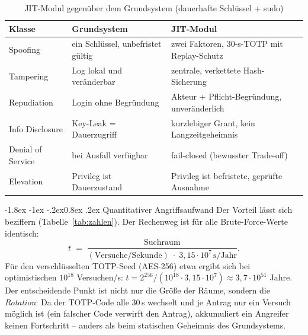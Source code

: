 \documentclass[11pt,a4paper]{article}
\makeatletter
\renewcommand\subsection{\@startsection{subsection}{2}{\z@}%
  {-1.8ex \@plus -1ex \@minus -.2ex}{0.8ex \@plus .2ex}%
  {\normalfont\large\bfseries}}
\makeatother
\begin{document}
\begin{table}[htbp]
  \centering
  \caption{JIT-Modul gegenüber dem Grundsystem (dauerhafte Schlüssel + sudo)}
  \label{tab:vergleich}
  \small
  \renewcommand{\arraystretch}{1.25}
  \begin{tabular}{@{}p{3.3cm}p{5.0cm}p{4.9cm}@{}}
    \toprule
    \textbf{Klasse} & \textbf{Grundsystem} & \textbf{JIT-Modul} \\
    \midrule
    Spoofing          & ein Schlüssel, unbefristet gültig    & zwei Faktoren, 30-s-TOTP mit Replay-Schutz \\
    \addlinespace[4pt]
    Tampering         & Log lokal und veränderbar            & zentrale, verkettete Hash-Sicherung \\
    \addlinespace[4pt]
    Repudiation       & Login ohne Begründung                & Akteur + Pflicht-Begründung, unveränderlich \\
    \addlinespace[4pt]
    Info Disclosure   & Key-Leak = Dauerzugriff              & kurzlebiger Grant, kein Langzeitgeheimnis \\
    \addlinespace[4pt]
    Denial of Service & bei Ausfall verfügbar                & fail-closed (bewusster Trade-off) \\
    \addlinespace[4pt]
    Elevation         & Privileg ist Dauerzustand            & Privileg ist befristete, geprüfte Ausnahme \\
    \bottomrule
  \end{tabular}
\end{table}

\subsection{Quantitativer Angriffsaufwand}
Der Vorteil lässt sich beziffern (Tabelle~\ref{tab:zahlen}). Der Rechenweg ist
für alle Brute-Force-Werte identisch:
\[
  t \;=\; \frac{\mathrm{Suchraum}}{(\mathrm{Versuche/Sekunde}) \;\cdot\; 3{,}15\cdot10^{7}\,\mathrm{s/Jahr}}.
\]
Für den verschlüsselten TOTP-Seed (AES-256) etwa ergibt sich bei optimistischen
$10^{18}$ Versuchen/s: $t = 2^{256}/(10^{18}\cdot 3{,}15\cdot10^{7}) \approx
3{,}7\cdot10^{51}$ Jahre. Der entscheidende Punkt ist nicht nur die Größe der
Räume, sondern die \emph{Rotation}: Da der TOTP-Code alle 30\,s wechselt und je
Antrag nur ein Versuch möglich ist (ein falscher Code verwirft den Antrag),
akkumuliert ein Angreifer keinen Fortschritt -- anders als beim statischen
Geheimnis des Grundsystems.
\end{document}
